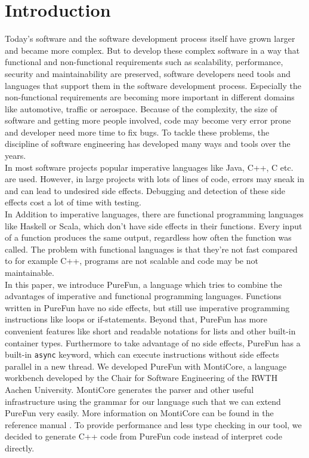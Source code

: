 \section{Introduction}


Today's software and the software development process itself have grown larger and became more complex. But to develop these complex software in a way that functional and non-functional requirements such as scalability, performance, security and maintainability are preserved, software developers need tools and languages that support them in the software development process.  Especially the non-functional requirements are becoming more important in different domains like automotive, traffic or aerospace. Because of the complexity, the size of software and getting more people involved, code may become very error prone and developer need more time to fix bugs. To tackle these problems, the discipline of software engineering has developed many ways and tools over the years.\\
In most software projects popular imperative languages like Java, C++, C etc. are used. However, in large projects with lots of lines of code, errors may sneak in and can lead to undesired side effects. Debugging and detection of these side effects cost a lot of time with testing.\\
In Addition to imperative languages, there are functional programming languages like Haskell or Scala, which don't have side effects in their functions. Every input of a function produces the same output, regardless how often the function was called. The problem with functional languages is that they're not fast compared to for example C++, programs are not scalable and code may be not maintainable.\\
In this paper, we introduce PureFun, a language which tries to combine the advantages of imperative and functional programming languages. Functions written in PureFun have no side effects, but still use imperative programming instructions like loops or if-statements. Beyond that, PureFun has more convenient features like short and readable notations for lists and other built-in container types. Furthermore to take advantage of no side effects, PureFun has a built-in \texttt{async} keyword, which can execute instructions without side effects parallel in a new thread. We developed PureFun with MontiCore, a language workbench developed by the Chair for Software Engineering of the RWTH Aachen University. MontiCore generates the parser and other useful infrastructure using the grammar for our language such that we can extend PureFun very easily. More information on MontiCore can be found in the reference manual \cite{monticore17:manual}. To provide performance and less type checking in our tool, we decided to generate C++ code from PureFun code instead of interpret code directly.\\
